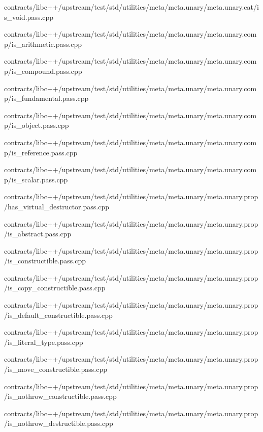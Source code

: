 \begin{DoxyCompactItemize}
contracts/libc++/upstream/test/std/utilities/meta/meta.\+unary/meta.\+unary.\+cat/is\+\_\+void.\+pass.\+cpp\item 
contracts/libc++/upstream/test/std/utilities/meta/meta.\+unary/meta.\+unary.\+comp/is\+\_\+arithmetic.\+pass.\+cpp\item 
contracts/libc++/upstream/test/std/utilities/meta/meta.\+unary/meta.\+unary.\+comp/is\+\_\+compound.\+pass.\+cpp\item 
contracts/libc++/upstream/test/std/utilities/meta/meta.\+unary/meta.\+unary.\+comp/is\+\_\+fundamental.\+pass.\+cpp\item 
contracts/libc++/upstream/test/std/utilities/meta/meta.\+unary/meta.\+unary.\+comp/is\+\_\+object.\+pass.\+cpp\item 
contracts/libc++/upstream/test/std/utilities/meta/meta.\+unary/meta.\+unary.\+comp/is\+\_\+reference.\+pass.\+cpp\item 
contracts/libc++/upstream/test/std/utilities/meta/meta.\+unary/meta.\+unary.\+comp/is\+\_\+scalar.\+pass.\+cpp\item 
contracts/libc++/upstream/test/std/utilities/meta/meta.\+unary/meta.\+unary.\+prop/has\+\_\+virtual\+\_\+destructor.\+pass.\+cpp\item 
contracts/libc++/upstream/test/std/utilities/meta/meta.\+unary/meta.\+unary.\+prop/is\+\_\+abstract.\+pass.\+cpp\item 
contracts/libc++/upstream/test/std/utilities/meta/meta.\+unary/meta.\+unary.\+prop/is\+\_\+constructible.\+pass.\+cpp\item 
contracts/libc++/upstream/test/std/utilities/meta/meta.\+unary/meta.\+unary.\+prop/is\+\_\+copy\+\_\+constructible.\+pass.\+cpp\item 
contracts/libc++/upstream/test/std/utilities/meta/meta.\+unary/meta.\+unary.\+prop/is\+\_\+default\+\_\+constructible.\+pass.\+cpp\item 
contracts/libc++/upstream/test/std/utilities/meta/meta.\+unary/meta.\+unary.\+prop/is\+\_\+literal\+\_\+type.\+pass.\+cpp\item 
contracts/libc++/upstream/test/std/utilities/meta/meta.\+unary/meta.\+unary.\+prop/is\+\_\+move\+\_\+constructible.\+pass.\+cpp\item 
contracts/libc++/upstream/test/std/utilities/meta/meta.\+unary/meta.\+unary.\+prop/is\+\_\+nothrow\+\_\+constructible.\+pass.\+cpp\item 
contracts/libc++/upstream/test/std/utilities/meta/meta.\+unary/meta.\+unary.\+prop/is\+\_\+nothrow\+\_\+destructible.\+pass.\+cpp\item 

\end{DoxyCompactItemize}
